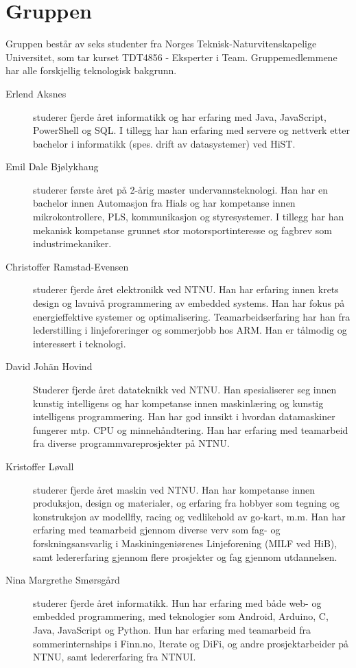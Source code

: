 \section{Gruppen}
Gruppen består av seks studenter fra Norges Teknisk-Naturvitenskapelige
Universitet, som tar kurset TDT4856 - Eksperter i Team. Gruppemedlemmene
har alle forskjellig teknologisk bakgrunn.
\begin{description} %

	\item[Erlend Aksnes] studerer fjerde året informatikk og har erfaring med Java, JavaScript, PowerShell og SQL. I tillegg har han erfaring med servere og nettverk etter bachelor i informatikk (spes. drift av datasystemer) ved HiST. 

	\item[Emil Dale Bjølykhaug] studerer første året på 2-årig master undervannsteknologi. 
Han har en bachelor innen Automasjon fra Hials og har kompetanse innen mikrokontrollere, PLS, 
kommunikasjon og styresystemer. I tillegg har han mekanisk kompetanse grunnet stor 
motorsportinteresse og fagbrev som industrimekaniker.

	\item[Christoffer Ramstad-Evensen] studerer fjerde
  året elektronikk ved NTNU. Han har erfaring innen krets design
  og lavnivå programmering av embedded systems. Han har fokus på energieffektive
  systemer og optimalisering. Teamarbeidserfaring har han fra lederstilling i
  linjeforeringer og sommerjobb hos ARM. Han er tålmodig og interessert i
  teknologi.
	\item[David Johän Hovind] Studerer fjerde året datateknikk ved NTNU. 
	Han spesialiserer seg innen kunstig intelligens og har kompetanse innen maskinlæring
	og kunstig intelligens programmering. Han har god innsikt i hvordan datamaskiner fungerer
	mtp. CPU og minnehåndtering. Han har erfaring med teamarbeid fra diverse 
	programmvareprosjekter på NTNU.
	\item[Kristoffer Løvall] studerer fjerde året maskin ved NTNU. 
	Han har kompetanse innen produksjon, design og materialer, og erfaring
	fra hobbyer som tegning og konstruksjon av modellfly, racing og vedlikehold
	av go-kart, m.m. Han har erfaring med teamarbeid gjennom diverse verv som fag-
	og forskningsansvarlig i Maskiningeniørenes Linjeforening (MILF ved HiB), samt
	ledererfaring gjennom flere prosjekter og fag gjennom utdannelsen.
	
	\item[Nina Margrethe Smørsgård] studerer fjerde året
	informatikk. Hun har erfaring med både web- og embedded programmering, med
	teknologier som Android, Arduino, C, Java, JavaScript og Python. Hun har
	erfaring med teamarbeid fra sommerinternships i Finn.no, Iterate og DiFi,
	og andre prosjektarbeider på NTNU, samt ledererfaring fra NTNUI.
\end{description}